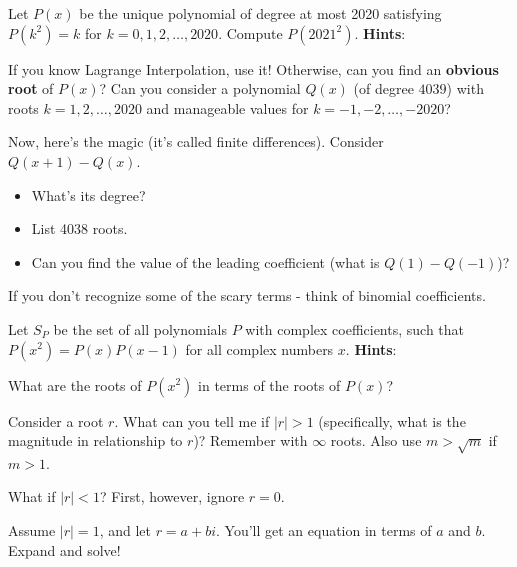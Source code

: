 \documentclass[11pt,titlepage]{scrartcl}
\newenvironment{hint}{\footnotesize \normalfont \textbf{Hints}:}{\hspace{-0.5ex}}
\begin{document}
\begin{problem}
Let $P(x)$ be the unique polynomial of degree at most 2020 satisfying $P(k^2) = k$ for $k = 0,1,2,\ldots,2020$. Compute $P(2021^2)$.
\begin{hint}
\begin{addhint}{
If you know Lagrange Interpolation, use it! Otherwise, can you find an \textbf{obvious root} of $P(x)$? Can you consider a polynomial $Q(x)$ (of degree $4039$) with roots $k=1,2,\ldots,2020$ and manageable values for $k=-1,-2,\ldots,-2020$?
}\end{addhint}
\begin{addhint}{
Now, here's the magic (it's called finite differences). Consider $Q(x+1)-Q(x)$.
\begin{itemize}
    \item What's its degree?
    \item List 4038 roots.
    \item Can you find the value of the leading coefficient (what is $Q(1)-Q(-1)$)?
\end{itemize}
}\end{addhint}
\begin{addhint}{
If you don't recognize some of the scary terms - think of binomial coefficients.
}\end{addhint}
\end{hint}
\end{problem}
\begin{problem}
Let $S_P$ be the set of all polynomials $P$ with complex coefficients, such that $P(x^2) = P (x)P (x- 1)$ for all complex numbers $x$.
\begin{hint}
\begin{addhint}{
What are the roots of $P(x^2)$ in terms of the roots of $P(x)$?
}\end{addhint}
\begin{addhint}{
Consider a root $r$. What can you tell me if $|r|>1$ (specifically, what is the magnitude in relationship to $r$)? Remember  with $\infty$ roots. Also use $m>\sqrt m$ if $m>1$.
}\end{addhint}
\begin{addhint}{
What if $|r|<1$? First, however, ignore $r=0$.
}\end{addhint}
\begin{addhint}{
Assume $|r|=1$, and let $r=a+bi$. You'll get an equation in terms of $a$ and $b$. Expand and solve!
}\end{addhint}
\end{hint}
\end{problem}
\clearpage
\end{document}
